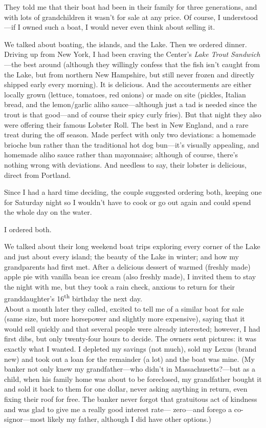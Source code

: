 They told me that their boat had been in their family for three
generations, and with lots of grandchildren it wasn't for sale at any
price. Of course, I understood---if I owned such a boat, I would never
even think about selling it.

We talked about boating, the islands, and the Lake. Then we ordered
dinner. Driving up from New York, I had been craving the Center's
\emph{Lake Trout Sandwich}---the best around (although they willingly
confess that the fish isn't caught from the Lake, but from northern New
Hampshire, but still never frozen and directly shipped early every
morning). It is delicious. And the accouterments are either locally
grown (lettuce, tomatoes, red onions) or made on site (pickles, Italian
bread, and the lemon/garlic aliho sauce---although just a tad is needed
since the trout is that good---and of course their spicy curly fries).
But that night they also were offering their famous Lobster Roll. The
best in New England, and a rare treat during the off season. Made
perfect with only two deviations: a homemade brioche bun rather than the
traditional hot dog bun---it's visually appealing, and homemade aliho
sauce rather than mayonnaise; although of course, there's nothing wrong
with deviations. And needless to say, their lobster is delicious, direct
from Portland.

Since I had a hard time deciding, the couple suggested ordering both,
keeping one for Saturday night so I wouldn't have to cook or go out
again and could spend the whole day on the water.

I ordered both.

We talked about their long weekend boat trips exploring every corner of
the Lake and just about every island; the beauty of the Lake in winter;
and how my grandparents had first met. After a delicious dessert of
warmed (freshly made) apple pie with vanilla bean ice cream (also
freshly made), I invited them to stay the night with me, but they took a
rain check, anxious to return for their granddaughter's
16\textsuperscript{th} birthday the next day.\\

About a month later they called, excited to tell me of a similar boat
for sale (same size, but more horsepower and slightly more expensive),
saying that it would sell quickly and that several people were already
interested; however, I had first dibs, but only twenty-four hours to
decide. The owners sent pictures: it was exactly what I wanted. I
depleted my savings (not much), sold my Lexus (brand new) and took out a
loan for the remainder (a lot) and the boat was mine. (My banker not
only knew my grandfather---who didn't in Massachusetts?---but as a
child, when his family home was about to be foreclosed, my grandfather
bought it and sold it back to them for one dollar, never asking anything
in return, even fixing their roof for free. The banker never forgot that
gratuitous act of kindness and was glad to give me a really good
interest rate--- zero---and forego a co-signor---most likely my father,
although I did have other options.)

